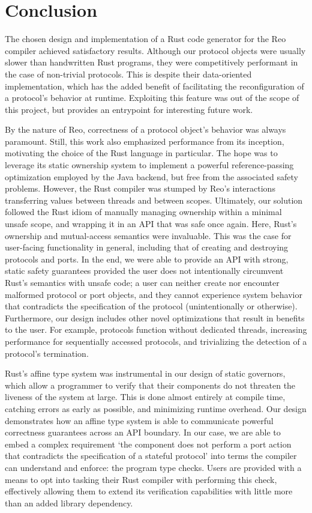 \section{Conclusion}

The chosen design and implementation of a Rust code generator for the Reo compiler achieved satisfactory results. Although our protocol objects were usually slower than handwritten Rust programs, they were competitively performant in the case of non-trivial protocols. This is despite their data-oriented implementation, which has the added benefit of facilitating the reconfiguration of a protocol's behavior at runtime. Exploiting this feature was out of the scope of this project, but provides an entrypoint for interesting future work.

By the nature of Reo, correctness of a protocol object's behavior was always paramount. Still, this work also emphasized performance from its inception, motivating the choice of the Rust language in particular. The hope was to leverage its static ownership system to implement a powerful reference-passing optimization employed by the Java backend, but free from the associated safety problems. However, the Rust compiler was stumped by Reo's interactions transferring values between threads and between scopes. Ultimately, our solution followed the Rust idiom of manually managing ownership within a minimal unsafe scope, and wrapping it in an API that was safe once again. Here, Rust's ownership and mutual-access semantics were invaluable. This was the case for user-facing functionality in general, including that of creating and destroying protocols and ports. In the end, we were able to provide an API with strong, static safety guarantees provided the user does not intentionally circumvent Rust's semantics with unsafe code; a user can neither create nor encounter malformed protocol or port objects, and they cannot experience system behavior that contradicts the specification of the protocol (unintentionally or otherwise). Furthermore, our design includes other novel optimizations that result in benefits to the user. For example, protocols function without dedicated threads, increasing performance for sequentially accessed protocols, and trivializing the detection of a protocol's termination.

Rust's affine type system was instrumental in our design of static governors, which allow a programmer to verify that their components do not threaten the liveness of the system at large. This is done almost entirely at compile time, catching errors as early as possible, and minimizing runtime overhead. Our design demonstrates how an affine type system is able to communicate powerful correctness guarantees across an API boundary. In our case, we are able to embed a complex requirement `the component does not perform a port action that contradicts the specification of a stateful protocol' into terms the compiler can understand and enforce: the program type checks. Users are provided with a means to opt into tasking their Rust compiler with performing this check, effectively allowing them to extend its verification capabilities with little more than an added library dependency. 


